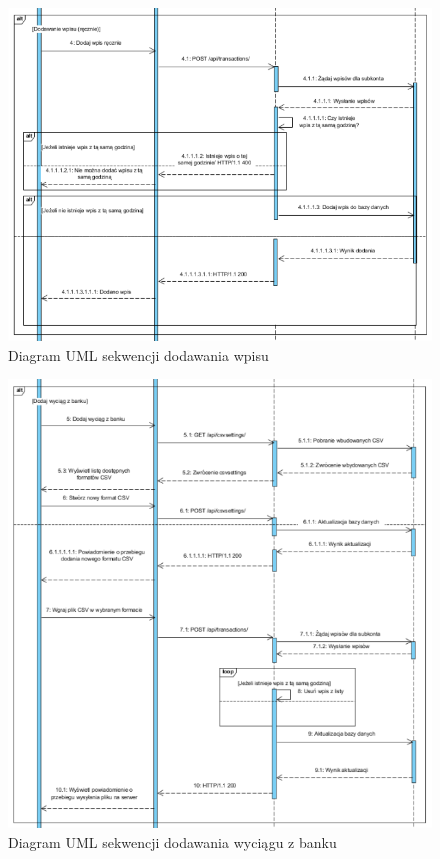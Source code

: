 \documentclass{article}
\begin{document}
	\begin{figure}[H]
		
		\hspace*{-1.5cm} 
		\includegraphics[scale=0.8]{assets/sq4.png}
		\caption[]{Diagram UML sekwencji dodawania wpisu}
		\label{fig:umlwpr}
	\end{figure} 
	\begin{figure}[H]
		
		\hspace*{-1.5cm} 
		\includegraphics[scale=0.9]{assets/sq5.png}
		\caption[]{Diagram UML sekwencji dodawania wyciągu z banku}
		\label{fig:umlwpb}
	\end{figure}
\end{document}

